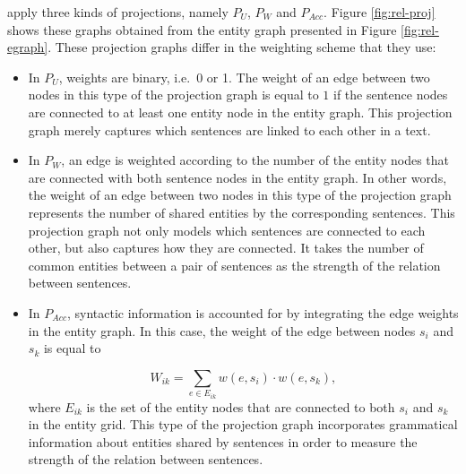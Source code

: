  apply three kinds of projections, namely $P_U$, $P_W$ and $P_{Acc}$. 
Figure \ref{fig:rel-proj} shows these graphs obtained from the entity graph presented in Figure \ref{fig:rel-egraph}. 
These projection graphs differ in the weighting scheme that they use: 

\begin{itemize}

	\item In $P_U$, weights are binary, i.e.\ 0 or 1. 
	The weight of an edge between two nodes in this type of the projection graph is equal to $1$ if the sentence nodes are connected to at least one entity node in the entity graph.  
	This projection graph merely captures which sentences are linked to each other in a text. 

	\item In $P_W$, an edge is weighted according to the number of the entity nodes that are connected with both sentence nodes in the entity graph. 
	In other words, the weight of an edge between two nodes in this type of the projection graph represents the number of shared entities by the corresponding sentences. 
	This projection graph not only models which sentences are connected to each other, but also captures how  they are connected. 
	It takes the number of common entities between a pair of sentences as the strength of the relation between sentences. 

	\item In $P_{Acc}$, syntactic information is accounted for by integrating the edge weights in the entity graph. 
	In this case, the weight of the edge between nodes $s_i$ and $s_k$ is equal to

	\begin{equation}
		W_{ik} = \sum_{e \in E_{ik}}{w(e,s_i) \cdot w(e,s_k)},
	\end{equation}
	where $E_{ik}$ is the set of the entity nodes that are connected to both $s_i$ and $s_k$ in the entity grid.  
	This type of the projection graph incorporates grammatical information about entities shared by sentences in order to measure the strength of the relation between sentences. 

\end{itemize}


